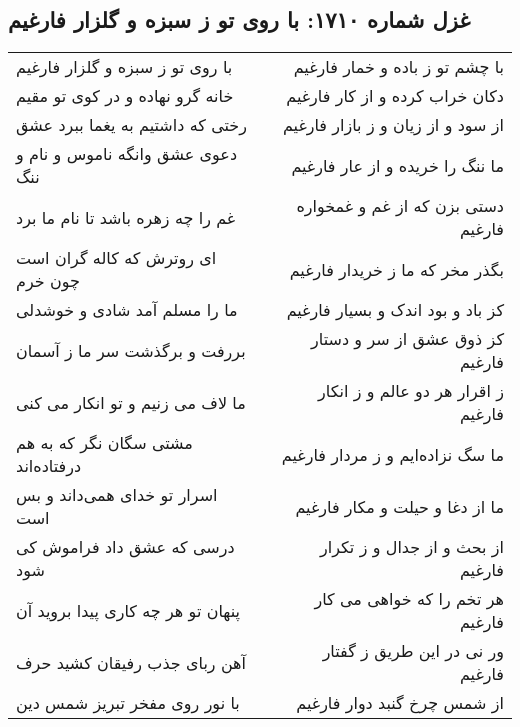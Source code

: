 \begin{center}
\section*{غزل شماره ۱۷۱۰: با روی تو ز سبزه و گلزار فارغیم}
\label{sec:1710}
\begin{longtable}{l p{0.5cm} r}
با روی تو ز سبزه و گلزار فارغیم
&&
با چشم تو ز باده و خمار فارغیم
\\
خانه گرو نهاده و در کوی تو مقیم
&&
دکان خراب کرده و از کار فارغیم
\\
رختی که داشتیم به یغما ببرد عشق
&&
از سود و از زیان و ز بازار فارغیم
\\
دعوی عشق وانگه ناموس و نام و ننگ
&&
ما ننگ را خریده و از عار فارغیم
\\
غم را چه زهره باشد تا نام ما برد
&&
دستی بزن که از غم و غمخواره فارغیم
\\
ای روترش که کاله گران است چون خرم
&&
بگذر مخر که ما ز خریدار فارغیم
\\
ما را مسلم آمد شادی و خوشدلی
&&
کز باد و بود اندک و بسیار فارغیم
\\
بررفت و برگذشت سر ما ز آسمان
&&
کز ذوق عشق از سر و دستار فارغیم
\\
ما لاف می زنیم و تو انکار می کنی
&&
ز اقرار هر دو عالم و ز انکار فارغیم
\\
مشتی سگان نگر که به هم درفتاده‌اند
&&
ما سگ نزاده‌ایم و ز مردار فارغیم
\\
اسرار تو خدای همی‌داند و بس است
&&
ما از دغا و حیلت و مکار فارغیم
\\
درسی که عشق داد فراموش کی شود
&&
از بحث و از جدال و ز تکرار فارغیم
\\
پنهان تو هر چه کاری پیدا بروید آن
&&
هر تخم را که خواهی می کار فارغیم
\\
آهن ربای جذب رفیقان کشید حرف
&&
ور نی در این طریق ز گفتار فارغیم
\\
با نور روی مفخر تبریز شمس دین
&&
از شمس چرخ گنبد دوار فارغیم
\\
\end{longtable}
\end{center}
